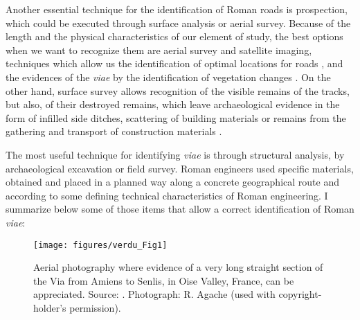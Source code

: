 	
	Another essential technique for the identification of Roman roads is prospection, which could be executed through surface analysis or aerial survey. Because of the length and the physical characteristics of our element of study, the best options when we want to recognize them are aerial survey and satellite imaging, techniques which allow us the identification of optimal locations for roads \parencite[412]{Sillières_1990}, and the evidences of the \textit{viae} by the identification of vegetation changes \parencite[416]{Sillières_1990}. On the other hand, surface survey allows recognition of the visible remains of the tracks, but also, of their destroyed remains, which leave archaeological evidence in the form of infilled side ditches, scattering of building materials or remains from the gathering and transport of construction materials \parencite[31]{Moreno_2009}.
	
	
	The most useful technique for identifying \textit{viae} is through structural analysis, by archaeological excavation or field survey. Roman engineers used specific materials, obtained and placed in a planned way along a concrete geographical route and according to some defining technical characteristics of Roman engineering. I summarize below some of those items that allow a correct identification of Roman \textit{viae}:
	
	\begin{figure}[!htb]
		\texttt{[image: figures/verdu\_Fig1]}
		\caption{Aerial photography where evidence of a very long straight section of the Via from Amiens to Senlis, in Oise Valley, France, can be appreciated. Source: \textcite[147]{Moreno_2004}. Photograph: R. Agache (used with copyright-holder’s permission).}
		\label{fig:verdu_Fig1}
	\end{figure}
	
